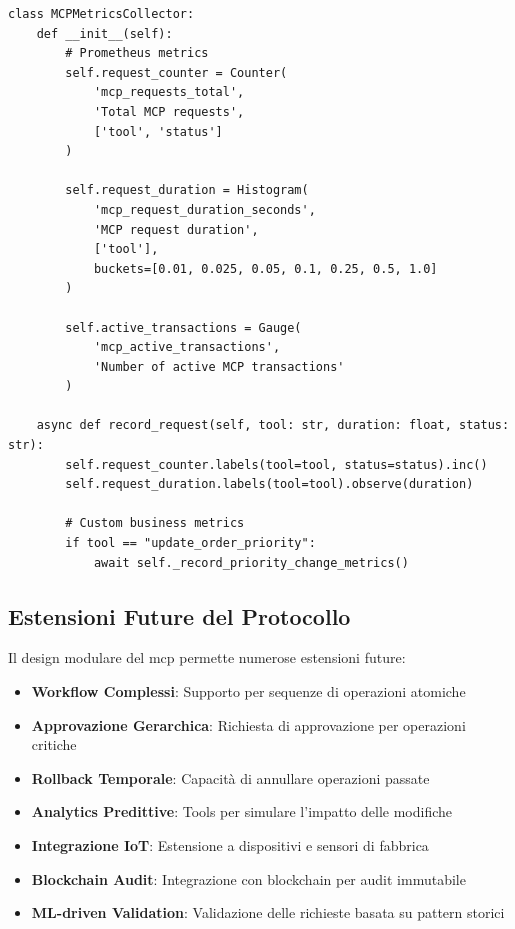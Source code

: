 \begin{listing}[H]
\begin{verbatim}
class MCPMetricsCollector:
    def __init__(self):
        # Prometheus metrics
        self.request_counter = Counter(
            'mcp_requests_total',
            'Total MCP requests',
            ['tool', 'status']
        )
        
        self.request_duration = Histogram(
            'mcp_request_duration_seconds',
            'MCP request duration',
            ['tool'],
            buckets=[0.01, 0.025, 0.05, 0.1, 0.25, 0.5, 1.0]
        )
        
        self.active_transactions = Gauge(
            'mcp_active_transactions',
            'Number of active MCP transactions'
        )
    
    async def record_request(self, tool: str, duration: float, status: str):
        self.request_counter.labels(tool=tool, status=status).inc()
        self.request_duration.labels(tool=tool).observe(duration)
        
        # Custom business metrics
        if tool == "update_order_priority":
            await self._record_priority_change_metrics()
\end{verbatim}
\caption{Sistema di metriche MCP}
\label{listing:mcp-metrics}
\end{listing}

\subsection{Estensioni Future del Protocollo}
Il design modulare del \gls{mcp} permette numerose estensioni future:

\begin{itemize}
    \item \textbf{Workflow Complessi}: Supporto per sequenze di operazioni atomiche
    \item \textbf{Approvazione Gerarchica}: Richiesta di approvazione per operazioni critiche
    \item \textbf{Rollback Temporale}: Capacità di annullare operazioni passate
    \item \textbf{Analytics Predittive}: Tools per simulare l'impatto delle modifiche
    \item \textbf{Integrazione IoT}: Estensione a dispositivi e sensori di fabbrica
    \item \textbf{Blockchain Audit}: Integrazione con blockchain per audit immutabile
    \item \textbf{ML-driven Validation}: Validazione delle richieste basata su pattern storici
\end{itemize}

